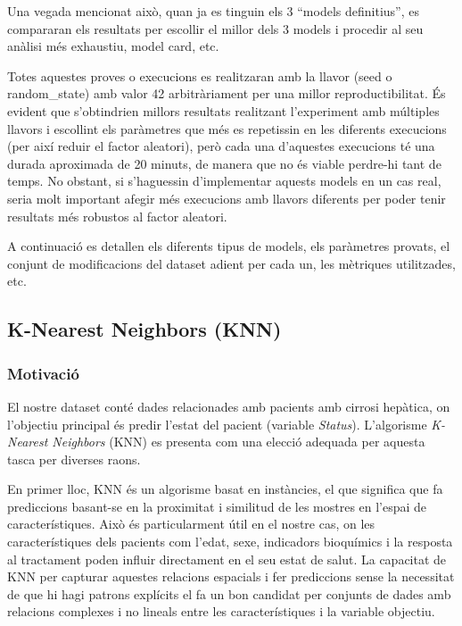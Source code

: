 Una vegada mencionat això, quan ja es tinguin els 3 ``models definitius'', es compararan els resultats per escollir el millor dels 3 models i procedir al seu anàlisi més exhaustiu, model card, etc.

Totes aquestes proves o execucions es realitzaran amb la llavor (seed o random\_state) amb valor 42 arbitràriament per una millor reproductibilitat. És evident que s'obtindrien millors resultats realitzant l'experiment amb múltiples llavors i escollint els paràmetres que més es repetissin en les diferents execucions (per així reduir el factor aleatori), però cada una d'aquestes execucions té una durada aproximada de 20 minuts, de manera que no és viable perdre-hi tant de temps. No obstant, si s'haguessin d'implementar aquests models en un cas real, seria molt important afegir més execucions amb llavors diferents per poder tenir resultats més robustos al factor aleatori.

A continuació es detallen els diferents tipus de models, els paràmetres provats, el conjunt de modificacions del dataset adient per cada un, les mètriques utilitzades, etc.

\subsection{K-Nearest Neighbors (KNN)}

\subsubsection{Motivació}
El nostre dataset conté dades relacionades amb pacients amb cirrosi hepàtica, on l'objectiu principal és predir l'estat del pacient (variable \textit{Status}). L'algorisme \textit{K-Nearest Neighbors} (KNN) es presenta com una elecció adequada per aquesta tasca per diverses raons.

En primer lloc, KNN és un algorisme basat en instàncies, el que significa que fa prediccions basant-se en la proximitat i similitud de les mostres en l'espai de característiques. Això és particularment útil en el nostre cas, on les característiques dels pacients com l'edat, sexe, indicadors bioquímics i la resposta al tractament poden influir directament en el seu estat de salut. La capacitat de KNN per capturar aquestes relacions espacials i fer prediccions sense la necessitat de que hi hagi patrons explícits el fa un bon candidat per conjunts de dades amb relacions complexes i no lineals entre les característiques i la variable objectiu.

